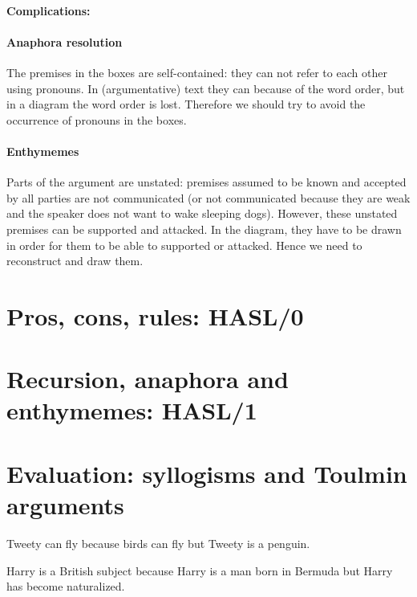 \documentclass{IOS-Book-Article}
\begin{document}
\paragraph{Complications:}

\paragraph{Anaphora resolution}
The premises in the boxes are self-contained: they can not refer to each other using pronouns. In (argumentative) text they can because of the word order, but in a diagram the word order is lost. Therefore we should try to avoid the occurrence of pronouns in the boxes.

\paragraph{Enthymemes}
Parts of the argument are unstated: premises assumed to be known and accepted by all parties are not communicated (or not communicated because they are weak and the speaker does not want to wake sleeping dogs). However, these unstated premises can be supported and attacked. In the diagram, they have to be drawn in order for them to be able to supported or attacked. Hence we need to reconstruct and draw them.

\section{Pros, cons, rules: HASL/0}


\section{Recursion, anaphora and enthymemes: HASL/1}


\section{Evaluation: syllogisms and Toulmin arguments}

\begin{exe}
	\ex Tweety can fly because birds can fly but Tweety is a penguin.

	\ex Harry is a British subject because Harry is a man born in Bermuda but Harry has become naturalized.
\end{exe}
\end{document}
